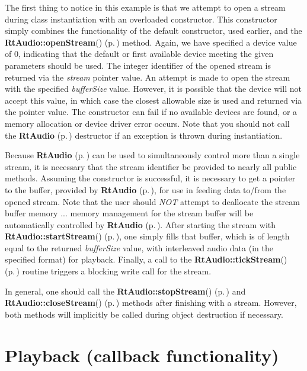 The first thing to notice in this example is that we attempt to open a stream during class instantiation with an overloaded constructor. This constructor simply combines the functionality of the default constructor, used earlier, and the {\bf Rt\-Audio::open\-Stream}() {\rm (p.\,\pageref{classRtAudio_a3})} method. Again, we have specified a device value of 0, indicating that the default or first available device meeting the given parameters should be used. The integer identifier of the opened stream is returned via the {\em stream} pointer value. An attempt is made to open the stream with the specified {\em buffer\-Size} value. However, it is possible that the device will not accept this value, in which case the closest allowable size is used and returned via the pointer value. The constructor can fail if no available devices are found, or a memory allocation or device driver error occurs. Note that you should not call the {\bf Rt\-Audio} {\rm (p.\,\pageref{classRtAudio})} destructor if an exception is thrown during instantiation.

Because {\bf Rt\-Audio} {\rm (p.\,\pageref{classRtAudio})} can be used to simultaneously control more than a single stream, it is necessary that the stream identifier be provided to nearly all public methods. Assuming the constructor is successful, it is necessary to get a pointer to the buffer, provided by {\bf Rt\-Audio} {\rm (p.\,\pageref{classRtAudio})}, for use in feeding data to/from the opened stream. Note that the user should {\em NOT} attempt to deallocate the stream buffer memory ... memory management for the stream buffer will be automatically controlled by {\bf Rt\-Audio} {\rm (p.\,\pageref{classRtAudio})}. After starting the stream with {\bf Rt\-Audio::start\-Stream}() {\rm (p.\,\pageref{classRtAudio_a11})}, one simply fills that buffer, which is of length equal to the returned {\em buffer\-Size} value, with interleaved audio data (in the specified format) for playback. Finally, a call to the {\bf Rt\-Audio::tick\-Stream}() {\rm (p.\,\pageref{classRtAudio_a9})} routine triggers a blocking write call for the stream.

In general, one should call the {\bf Rt\-Audio::stop\-Stream}() {\rm (p.\,\pageref{classRtAudio_a12})} and {\bf Rt\-Audio::close\-Stream}() {\rm (p.\,\pageref{classRtAudio_a10})} methods after finishing with a stream. However, both methods will implicitly be called during object destruction if necessary.

\section{Playback (callback functionality)}\label{playbackc}


